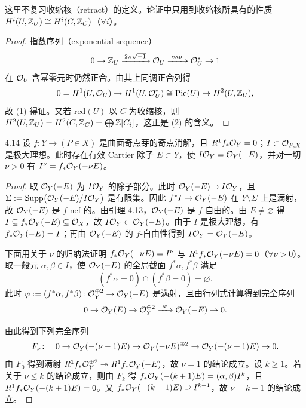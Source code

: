 这里不复习收缩核（retract）的定义。论证中只用到收缩核所具有的性质 $H^i(U,\mathbb{Z}_U)\cong H^i(C,\mathbb{Z}_C)$（$\forall i$）。

\begin{proof}
指数序列（exponential sequence）
\[
0\to\Z_U\xrightarrow{\,2\pi\sqrt{-1}\,}\cO_U\xrightarrow{\ \exp\ }\cO_U^*\to 1
\]
在 $\mathcal{O}_U$ 含幂零元时仍然正合。由其上同调正合列得
\[
0=H^1(U,\mathcal{O}_U)\to H^1(U,\mathcal{O}_U^*)\cong\operatorname{Pic}(U)\to H^2(U,\mathbb{Z}_U),
\]
故 (1) 得证。又若 $\mathrm{red}(U)$ 以 $C$ 为收缩核，则 $H^2(U,\mathbb{Z}_U)=H^2(C,\mathbb{Z}_C)=\bigoplus\mathbb{Z}[C_i]$，这正是 (2) 的含义。
\end{proof}


\begin{corollaryp}{4.14}
设 $f\colon Y\to(P\in X)$ 是曲面奇点芽的奇点消解，且 $R^1f_*\mathcal{O}_Y=0$；$I\subset\mathcal{O}_{P,X}$ 是极大理想。此时存在有效 Cartier 除子 $E\subset Y$，使 $I\mathcal{O}_Y=\mathcal{O}_Y(-E)$，并对一切 $\nu>0$ 有 $I^\nu=f_*\mathcal{O}_Y(-\nu E)$。
\end{corollaryp}

\begin{proof}
取 $\mathcal{O}_Y(-E)$ 为 $I\mathcal{O}_Y$ 的除子部分。此时 $\mathcal{O}_Y(-E)\supset I\mathcal{O}_Y$，且 $\Sigma:=\operatorname{Supp}\bigl(\mathcal{O}_Y(-E)/I\mathcal{O}_Y\bigr)$ 是有限集。因此 $f^*I\to\mathcal{O}_Y(-E)$ 在 $Y\setminus\Sigma$ 上是满射，故 $\mathcal{O}_Y(-E)$ 是 $f$-nef 的。由引理 4.13，$\mathcal{O}_Y(-E)$ 是 $f$-自由的。由 $E\ne\varnothing$ 得 $I\subseteq f_*\mathcal{O}_Y(-E)\subseteq\mathcal{O}_X$，故 $I\mathcal{O}_Y\subset\mathcal{O}_Y(-E)$。由于 $I$ 是极大理想，有 $f_*\mathcal{O}_Y(-E)=I$；再由 $\mathcal{O}_Y(-E)$ 的 $f$-自由性得到 $I\mathcal{O}_Y=\mathcal{O}_Y(-E)$。

下面用关于 $\nu$ 的归纳法证明 $f_*\mathcal{O}_Y(-\nu E)=I^\nu$ 与 $R^1f_*\mathcal{O}_Y(-\nu E)=0$（$\forall\nu>0$）。取一般元 $\alpha,\beta\in I$，使 $\mathcal{O}_Y(-E)$ 的全局截面 $f^*\alpha,f^*\beta$ 满足
\[
(f^*\alpha=0)\cap(f^*\beta=0)=\varnothing .
\]
此时 $\varphi:=(f^*\alpha,f^*\beta)\colon\mathcal{O}_Y^{\oplus2}\to\mathcal{O}_Y(-E)$ 是满射，且由行列式计算得到完全序列
\[
0\to\cO_Y(E)\to\cO_Y^{\oplus2}\xrightarrow{\ \varphi\ }\cO_Y(-E)\to 0 .
\]

由此得到下列完全序列
\[
F_\nu\colon\quad 0\to\mathcal{O}_Y(-(\nu-1)E)\to\mathcal{O}_Y(-\nu E)^{\oplus2}\to\mathcal{O}_Y(-(\nu+1)E)\to 0 .
\]
由 $F_0$ 得到满射 $R^1f_*\mathcal{O}_Y^{\oplus2}\twoheadrightarrow R^1f_*\mathcal{O}_Y(-E)$，故 $\nu=1$ 的结论成立。设 $k\ge 1$。若关于 $\nu\le k$ 的结论成立，则由 $F_k$ 得 $f_*\mathcal{O}_Y(-(k+1)E)=(\alpha,\beta)I^k$，且 $R^1f_*\mathcal{O}_Y(-(k+1)E)=0$。又 $f_*\mathcal{O}_Y(-(k+1)E)\supseteq I^{k+1}$，故 $\nu=k+1$ 的结论成立。
\end{proof}

